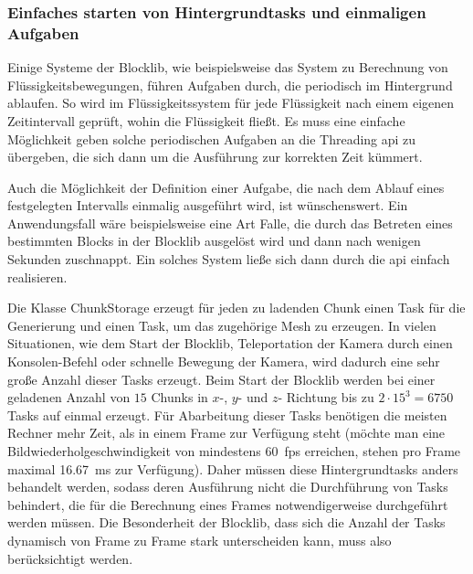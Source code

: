 \subsubsection{Einfaches starten von Hintergrundtasks und einmaligen Aufgaben}\label{sec:reqBackgroundTasks}
Einige Systeme der Blocklib, wie beispielsweise das System zu Berechnung von Flüssigkeitsbewegungen, führen Aufgaben durch, die periodisch im Hintergrund ablaufen. So wird im Flüssigkeitssystem für jede Flüssigkeit nach einem eigenen Zeitintervall geprüft, wohin die Flüssigkeit fließt. Es muss eine einfache Möglichkeit geben solche periodischen Aufgaben an die Threading \acs{api} zu übergeben, die sich dann um die Ausführung zur korrekten Zeit kümmert.

Auch die Möglichkeit der Definition einer Aufgabe, die nach dem Ablauf eines festgelegten Intervalls einmalig ausgeführt wird, ist wünschenswert. Ein Anwendungsfall wäre beispielsweise eine Art Falle, die durch das Betreten eines bestimmten Blocks in der Blocklib ausgelöst wird und dann nach wenigen Sekunden zuschnappt. Ein solches System ließe sich dann durch die \acs{api} einfach realisieren.

Die Klasse ChunkStorage erzeugt für jeden zu ladenden Chunk einen Task für die Generierung und einen Task, um das zugehörige Mesh zu erzeugen. In vielen Situationen, wie dem Start der Blocklib, Teleportation der Kamera durch einen Konsolen-Befehl oder schnelle Bewegung der Kamera, wird dadurch eine sehr große Anzahl dieser Tasks erzeugt. Beim Start der Blocklib werden bei einer geladenen Anzahl von $15$ Chunks in  $x$-, $y$- und $z$- Richtung bis zu $2\cdot15^3=6750$  Tasks auf einmal erzeugt. Für Abarbeitung dieser Tasks benötigen die meisten Rechner mehr Zeit, als in einem Frame zur Verfügung steht (möchte man eine Bildwiederholgeschwindigkeit von mindestens 60~\ac{fps} erreichen, stehen pro Frame maximal \SI{16,67}{\milli\second} zur Verfügung). Daher müssen diese Hintergrundtasks anders behandelt werden, sodass deren Ausführung nicht die Durchführung von Tasks behindert, die für die Berechnung eines Frames notwendigerweise durchgeführt werden müssen. Die Besonderheit der Blocklib, dass sich die Anzahl der Tasks  dynamisch von Frame zu Frame stark unterscheiden kann, muss also berücksichtigt werden.